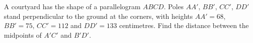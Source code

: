 A courtyard has the shape of a parallelogram $ABCD$. Poles $AA'$, $BB'$, $CC'$, $DD'$ stand perpendicular to the ground at the corners, with heights $AA'=68$, $BB'=75$, $CC'=112$ and $DD'=133$ centimetres. Find the distance between the midpoints of $A'C'$ and $B'D'$.
